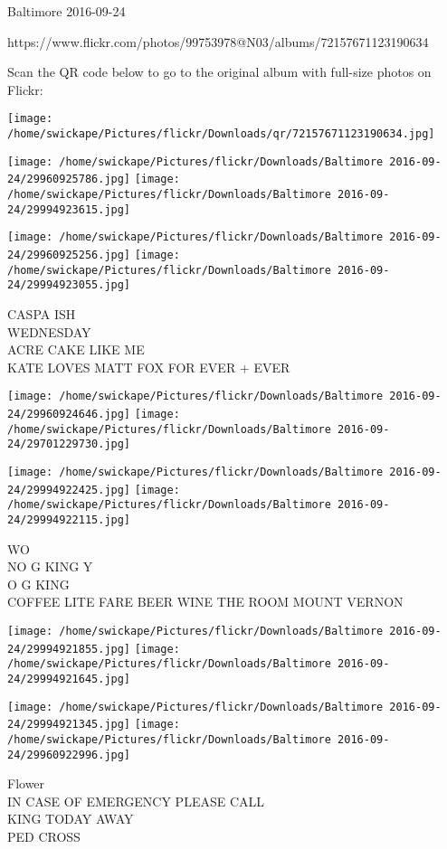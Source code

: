 \documentclass[10pt,letterpaper]{article}
\begin{document}
Baltimore 2016-09-24

https://www.flickr.com/photos/99753978@N03/albums/72157671123190634

Scan the QR code below to go to the original album with full-size photos on Flickr:

\texttt{[image: /home/swickape/Pictures/flickr/Downloads/qr/72157671123190634.jpg]}
\pagebreak

\texttt{[image: /home/swickape/Pictures/flickr/Downloads/Baltimore 2016-09-24/29960925786.jpg]}
\texttt{[image: /home/swickape/Pictures/flickr/Downloads/Baltimore 2016-09-24/29994923615.jpg]}

\texttt{[image: /home/swickape/Pictures/flickr/Downloads/Baltimore 2016-09-24/29960925256.jpg]}
\texttt{[image: /home/swickape/Pictures/flickr/Downloads/Baltimore 2016-09-24/29994923055.jpg]}

CASPA ISH\\
WEDNESDAY\\
ACRE CAKE LIKE ME\\
KATE LOVES MATT FOX FOR EVER + EVER
\pagebreak

\texttt{[image: /home/swickape/Pictures/flickr/Downloads/Baltimore 2016-09-24/29960924646.jpg]}
\texttt{[image: /home/swickape/Pictures/flickr/Downloads/Baltimore 2016-09-24/29701229730.jpg]}

\texttt{[image: /home/swickape/Pictures/flickr/Downloads/Baltimore 2016-09-24/29994922425.jpg]}
\texttt{[image: /home/swickape/Pictures/flickr/Downloads/Baltimore 2016-09-24/29994922115.jpg]}

WO\\
NO G KING Y\\
O G KING\\
COFFEE LITE FARE BEER WINE THE ROOM MOUNT VERNON
\pagebreak

\texttt{[image: /home/swickape/Pictures/flickr/Downloads/Baltimore 2016-09-24/29994921855.jpg]}
\texttt{[image: /home/swickape/Pictures/flickr/Downloads/Baltimore 2016-09-24/29994921645.jpg]}

\texttt{[image: /home/swickape/Pictures/flickr/Downloads/Baltimore 2016-09-24/29994921345.jpg]}
\texttt{[image: /home/swickape/Pictures/flickr/Downloads/Baltimore 2016-09-24/29960922996.jpg]}

Flower\\
IN CASE OF EMERGENCY PLEASE CALL\\
KING TODAY AWAY\\
PED CROSS
\pagebreak
\end{document}
